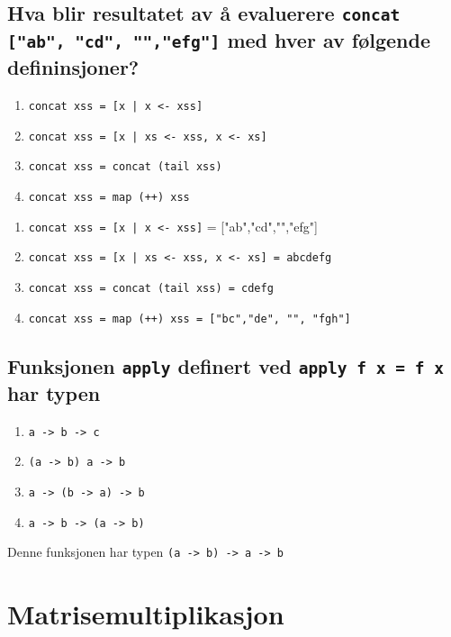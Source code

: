 \documentclass{article}
\begin{document}
    \subsection{Hva blir resultatet av å evaluerere \texttt{concat ["ab", "cd", "","efg"]} med hver av følgende defininsjoner?}

    \begin{enumerate}[label=\alph*)]
        \item \texttt{concat xss = [x | x <- xss]}
        \item \texttt{concat xss = [x | xs <- xss, x <- xs]}
        \item \texttt{concat xss = concat (tail xss)}
        \item \texttt{concat xss = map (++) xss}
    \end{enumerate}

    \begin{ans}
    \begin{enumerate}[label=\alph*)]
        \item \texttt{concat xss = [x | x <- xss]} = ["ab","cd","","efg"] 
        \item \texttt{concat xss = [x | xs <- xss, x <- xs] = abcdefg}
        \item \texttt{concat xss = concat (tail xss) = cdefg}
        \item \texttt{concat xss = map (++) xss = ["bc","de", "", "fgh"]}
    \end{enumerate}
    \end{ans}


    \subsection{Funksjonen \texttt{apply} definert ved \texttt{apply f x = f x} har typen}
    \begin{enumerate}[label=\alph*)]
        \item \texttt{a -> b -> c}
        \item \texttt{(a -> b) a -> b}
        \item \texttt{a -> (b -> a) -> b}
        \item \texttt{a -> b -> (a -> b)}
    \end{enumerate}

    \begin{ans}
        Denne funksjonen har typen \texttt{(a -> b) -> a -> b}
    \end{ans}

    \section{Matrisemultiplikasjon}
\end{document}
